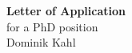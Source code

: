 \begin{titlepage}
\centering
\vspace*{1.5in}

\hspace*{-3cm}
\textbf{\Huge{Letter of Application}}
\\
\vspace*{0.6in}
\hspace*{-3cm}
\Large{for a PhD position}
\vspace*{1.1in}
\\
\hspace*{-3cm}
\Large{Dominik Kahl}
\vfil

\end{titlepage}